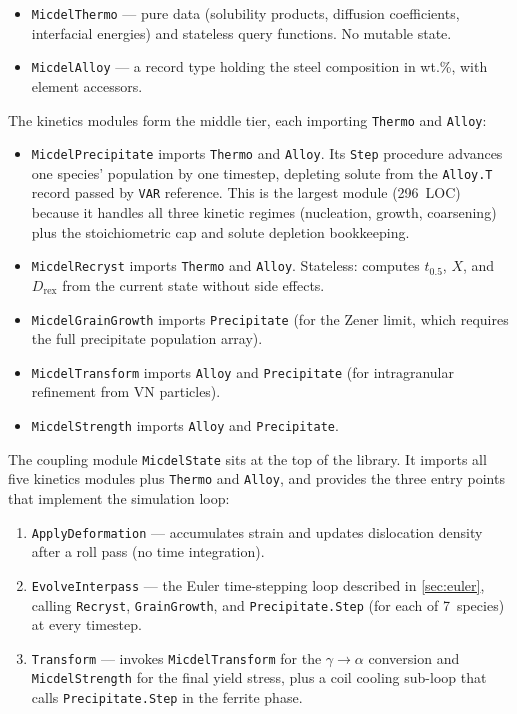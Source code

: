 \documentclass[11pt,a4paper]{article}
\begin{document}
\begin{itemize}
  \item \texttt{MicdelThermo} --- pure data (solubility products, diffusion
    coefficients, interfacial energies) and stateless query functions.
    No mutable state.
  \item \texttt{MicdelAlloy} --- a record type holding the steel composition
    in wt.\%, with element accessors.
\end{itemize}

\noindent The kinetics modules form the middle tier, each importing
\texttt{Thermo} and \texttt{Alloy}:

\begin{itemize}
  \item \texttt{MicdelPrecipitate} imports \texttt{Thermo} and \texttt{Alloy}.
    Its \texttt{Step} procedure advances one species' population by one
    timestep, depleting solute from the \texttt{Alloy.T} record passed by
    \texttt{VAR} reference.  This is the largest module (296~LOC) because it
    handles all three kinetic regimes (nucleation, growth, coarsening) plus
    the stoichiometric cap and solute depletion bookkeeping.
  \item \texttt{MicdelRecryst} imports \texttt{Thermo} and \texttt{Alloy}.
    Stateless: computes $t_{0.5}$, $X$, and $D_\mathrm{rex}$ from the current
    state without side effects.
  \item \texttt{MicdelGrainGrowth} imports \texttt{Precipitate} (for the
    Zener limit, which requires the full precipitate population array).
  \item \texttt{MicdelTransform} imports \texttt{Alloy} and
    \texttt{Precipitate} (for intragranular refinement from VN particles).
  \item \texttt{MicdelStrength} imports \texttt{Alloy} and
    \texttt{Precipitate}.
\end{itemize}

\noindent The coupling module \texttt{MicdelState} sits at the top of the
library.  It imports all five kinetics modules plus \texttt{Thermo} and
\texttt{Alloy}, and provides the three entry points that implement the
simulation loop:

\begin{enumerate}
  \item \texttt{ApplyDeformation} --- accumulates strain and updates
    dislocation density after a roll pass (no time integration).
  \item \texttt{EvolveInterpass} --- the Euler time-stepping loop described
    in \cref{sec:euler}, calling \texttt{Recryst}, \texttt{GrainGrowth}, and
    \texttt{Precipitate.Step} (for each of 7~species) at every timestep.
  \item \texttt{Transform} --- invokes \texttt{MicdelTransform} for the
    $\gamma\to\alpha$ conversion and \texttt{MicdelStrength} for the final
    yield stress, plus a coil cooling sub-loop that calls
    \texttt{Precipitate.Step} in the ferrite phase.
\end{enumerate}
\end{document}
